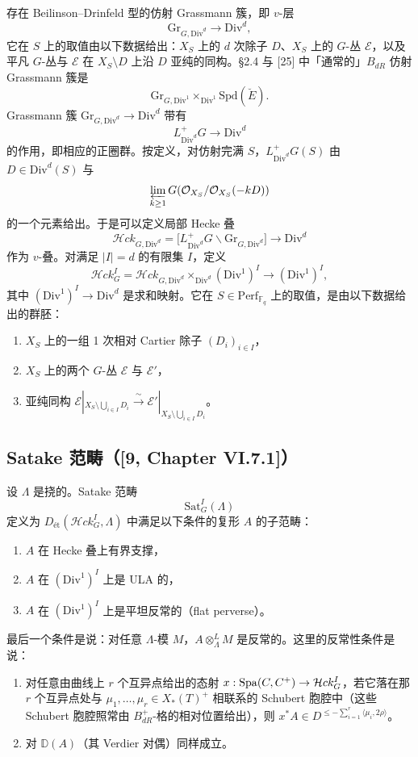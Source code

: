 存在 Beilinson--Drinfeld 型的仿射 Grassmann 簇，即 $v$-层
\[
\mathrm{Gr}_{G,\mathrm{Div}^d}\longrightarrow\mathrm{Div}^d,
\]
它在 $S$ 上的取值由以下数据给出：$X_S$ 上的 $d$ 次除子 $D$、$X_S$ 上的 $G$-丛 $\mathcal E$，以及平凡 $G$-丛与 $\mathcal E$ 在 $X_S\setminus D$ 上沿 $D$ 亚纯的同构。§2.4 与 [25] 中「通常的」$B_{dR}$ 仿射 Grassmann 簇是
\[
\mathrm{Gr}_{G,\mathrm{Div}^1}\times_{\mathrm{Div}^1}\mathrm{Spd}(\breve E).
\]
Grassmann 簇 $\mathrm{Gr}_{G,\mathrm{Div}^d}\to\mathrm{Div}^d$ 带有
\[
L^+_{\mathrm{Div}^d}G\longrightarrow\mathrm{Div}^d
\]
的作用，即相应的正圈群。按定义，对仿射完满 $S$，$L^+_{\mathrm{Div}^d}G(S)$ 由 $D\in\mathrm{Div}^d(S)$ 与
\[
\varprojlim_{k\ge1}G(\mathcal O_{X_S}/\mathcal O_{X_S}(-kD))
\]
的一个元素给出。于是可以定义局部 Hecke 叠
\[
\mathcal{H}ck_{G,\mathrm{Div}^d}=\big[L^+_{\mathrm{Div}^d}G\backslash\mathrm{Gr}_{G,\mathrm{Div}^d}\big]\longrightarrow\mathrm{Div}^d
\]
作为 $v$-叠。对满足 $|I|=d$ 的有限集 $I$，定义
\[
\mathcal{H}ck^I_G=\mathcal{H}ck_{G,\mathrm{Div}^d}\times_{\mathrm{Div}^d}(\mathrm{Div}^1)^I\longrightarrow(\mathrm{Div}^1)^I,
\]
其中 $(\mathrm{Div}^1)^I\to\mathrm{Div}^d$ 是求和映射。它在 $S\in\mathrm{Perf}_{\mathbb F_q}$ 上的取值，是由以下数据给出的群胚：
\begin{enumerate}[label=(\arabic*),leftmargin=2.4em,itemsep=0.2em]
\item $X_S$ 上的一组 1 次相对 Cartier 除子 $(D_i)_{i\in I}$，
\item $X_S$ 上的两个 $G$-丛 $\mathcal E$ 与 $\mathcal E'$，
\item 亚纯同构 $\mathcal E|_{X_S\setminus\bigcup_{i\in I}D_i}\xrightarrow{\ \sim\ }\mathcal E'|_{X_S\setminus\bigcup_{i\in I}D_i}$。
\end{enumerate}

\subsection{Satake 范畴（[9, Chapter VI.7.1]）}

设 $\Lambda$ 是挠的。Satake 范畴
\[
\mathrm{Sat}^I_G(\Lambda)
\]
定义为 $D_{\text{ét}}(\mathcal{H}ck^I_G,\Lambda)$ 中满足以下条件的复形 $A$ 的子范畴：
\begin{enumerate}[label=(\arabic*),leftmargin=2.4em,itemsep=0.2em]
\item $A$ 在 Hecke 叠上有界支撑，
\item $A$ 在 $(\mathrm{Div}^1)^I$ 上是 ULA 的，
\item $A$ 在 $(\mathrm{Div}^1)^I$ 上是平坦反常的（flat perverse）。
\end{enumerate}
最后一个条件是说：对任意 $\Lambda$-模 $M$，$A\otimes^L_\Lambda M$ 是反常的。这里的反常性条件是说：
\begin{enumerate}[label=(\arabic*),leftmargin=2.4em,itemsep=0.2em]
\item 对任意由曲线上 $r$ 个互异点给出的态射 $x:\operatorname{Spa}(C,C^+)\to\mathcal{H}ck^I_G$，若它落在那 $r$ 个互异点处与 $\mu_1,\dots,\mu_r\in X_*(T)^+$ 相联系的 Schubert 胞腔中（这些 Schubert 胞腔照常由 $B^+_{dR}$-格的相对位置给出），则 $x^*A\in D^{\le-\sum_{i=1}^r\langle\mu_i,2\rho\rangle}$。
\item 对 $\mathbb D(A)$（其 Verdier 对偶）同样成立。
\end{enumerate}

